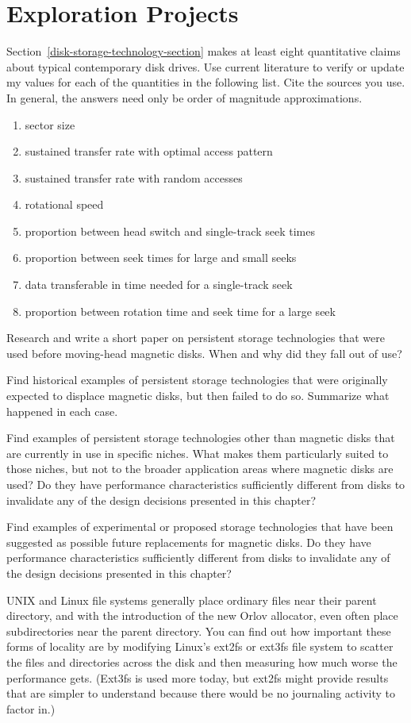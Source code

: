 \section*{Exploration Projects}
\begin{chapterEnumerate}
\item
Section~\ref{disk-storage-technology-section} makes at least eight
quantitative claims about typical contemporary disk drives.  Use
current literature to verify or update my values for each of the quantities in the following list.  Cite
the sources you use.  In general, the answers need only be order of
magnitude approximations.
\begin{enumerate}
\item sector size
\item sustained transfer rate with optimal access pattern
\item sustained transfer rate with random accesses
\item rotational speed
\item proportion between head switch and single-track seek times
\item proportion between seek times for large and small seeks
\item data transferable in time needed for a single-track seek
\item proportion between rotation time and seek time for a large seek
\end{enumerate}
\item Research and write a short paper on persistent storage
technologies that were used before moving-head magnetic disks.  When
and why did they fall out of use?
\item Find historical examples of persistent storage technologies that
were originally expected to displace magnetic disks, but then failed
to do so.  Summarize what happened in each case.
\item Find examples of persistent storage technologies other than
magnetic disks that are currently in use in specific niches.  What
makes them particularly suited to those niches, but not to the broader
application areas where magnetic disks are used?  Do they have
performance characteristics sufficiently different from disks to
invalidate any of the design decisions presented in this chapter?
\item Find examples of experimental or proposed storage technologies
that have been suggested as possible future replacements for magnetic
disks.  Do they have performance characteristics sufficiently
different from disks to invalidate any of the design decisions presented in this
chapter?
\item
UNIX and Linux file systems generally place ordinary files near their
parent directory, and with the introduction of the new Orlov
allocator, even often place subdirectories near the parent directory.
You can find out how important these forms of locality are by
modifying Linux's ext2fs or ext3fs file system to scatter the files and
directories across the disk and then measuring how much worse the performance
gets.  (Ext3fs is used more today, but ext2fs might provide results that
are simpler to understand because there would be no journaling activity
to factor in.)


\end{chapterEnumerate}
